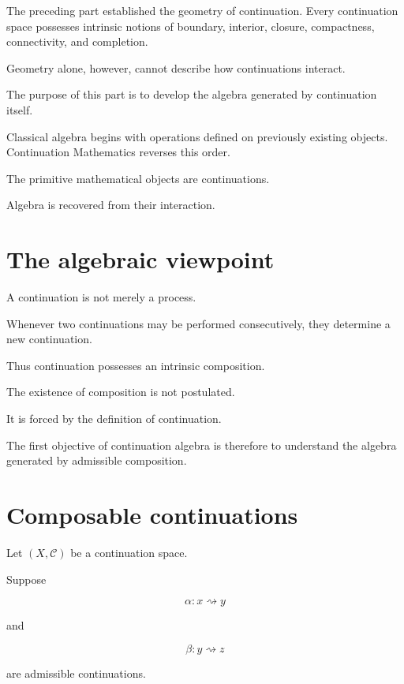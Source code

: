 \documentclass[13pt,openany]{book}
\theoremstyle{plain}
\theoremstyle{definition}
\begin{document}
The preceding part established the geometry of continuation. Every continuation
space possesses intrinsic notions of boundary, interior, closure,
compactness, connectivity, and completion.

Geometry alone, however, cannot describe how continuations interact.

The purpose of this part is to develop the algebra generated by continuation
itself.

Classical algebra begins with operations defined on previously existing
objects. Continuation Mathematics reverses this order.

The primitive mathematical objects are continuations.

Algebra is recovered from their interaction.

\section{The algebraic viewpoint}

A continuation is not merely a process.

Whenever two continuations may be performed consecutively, they determine a
new continuation.

Thus continuation possesses an intrinsic composition.

The existence of composition is not postulated.

It is forced by the definition of continuation.

The first objective of continuation algebra is therefore to understand the
algebra generated by admissible composition.

\section{Composable continuations}

Let $(X,\mathcal C)$ be a continuation space.

Suppose

\[
\alpha:x\rightsquigarrow y
\]

and

\[
\beta:y\rightsquigarrow z
\]

are admissible continuations.
\end{document}
